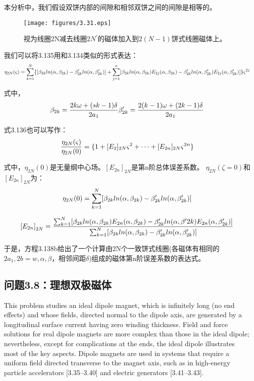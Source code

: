 本分析中，我们假设双饼内部的间隙和相邻双饼之间的间隙是相等的。
\begin{figure}[htbp]
	\centering
	\texttt{[image: figures/3.31.eps]}
	\caption{视为线圈2N减去线圈$2N^\prime$的磁体加入到$2(N-1)$饼式线圈磁体上。}
\end{figure}

我们可以将3.135用和3.134类似的形式表达：
$$
\eta_{2N}(\varsigma)=\sum_{k=1}^{N}\{[\beta_{2k}ln(\alpha,\beta_{2k})-\beta'_{2k}ln(\alpha,\beta'_{2k})]\\
+\sum_{j=1}^{n}[\beta_{2k}ln(\alpha,\beta_{2k})E_{2j}(\alpha,\beta_{2k})-\beta'_{2k}ln(\alpha,\beta'_{2k})E_{2j}(\alpha,\beta'_{2k})]\}\varsigma^{2j}\\%
$$

式中，
$$
\beta_{2k}=\frac{2k\omega+(sk-1)\delta}{2a_1}\\ \beta'_{2k}=\frac{2(k-1)\omega+(2k-1)\delta}{2a_{1}}\\
$$

式3.136也可以写作：
\begin{equation}
\frac{\eta_{2N}(\varsigma)}{\eta_{2N}(0)}=\{1+[E_{2}]_{2N}\varsigma^2+\cdots+[E_{2n}]_{2N}\varsigma^{2n}\}\\%
\end{equation}

式中，$\eta_{2N}(0)$是无量纲中心场。$[E_{2n}]_{2N}$是第n阶总体误差系数。
$\eta_{2N}(\zeta=0)$和$[E_{2n}]_{2N}$为：
$$
\eta_{2N}(0)=\sum_{k=1}^{N}[\beta_{2k}ln(\alpha,\beta_{2k})-\beta'_{2k}ln(\alpha,\beta'_{2k})]\\%
$$

$$
{[E_{2n}]}_{2N}=\frac{\sum_{k=1}^{N}[\beta_{2k}ln(\alpha,\beta_{2k})E_{2n}(\alpha,\beta_{2k})-\beta'_{2k}ln(\alpha,\beta'{2k})E_{2n}(\alpha,\beta'_{2k})]}{\sum_{k=1}^{N}[\beta_{2k}ln(\alpha,\beta_{2k})-\beta'_{2k}ln(\alpha,\beta'_{2k})]}\\%
$$

于是，方程3.138b给出了一个计算由2N个一致饼式线圈(各磁体有相同的$2a_1,2b=w,\alpha,\beta$，相邻间距$\delta$)组成的磁体第n阶误差系数的表达式。
\newpage


\subsection{问题3.8：理想双极磁体}

This problem studies an ideal dipole magnet, which is infinitely long (no end effects) and whose fields, directed normal to the dipole axis, are generated by a
longitudinal surface current having zero winding thickness. Field and force solutions for real dipole magnets are more complex than those in the ideal dipole;
nevertheless, except for complications at the ends, the ideal dipole illustrates most
of the key aspects. Dipole magnets are used in systems that require a uniform
field directed transverse to the magnet axis, such as in high-energy particle accelerators [3.35–3.40] and electric generators [3.41–3.43].

